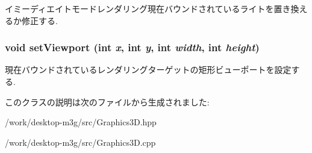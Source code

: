 イミーディエイトモードレンダリング現在バウンドされているライトを置き換えるか修正する. \hypertarget{classm3g_1_1Graphics3D_0b4ec48e9c19060e9be5648c118c23b1}{
\subsubsection[{setViewport}]{\setlength{\rightskip}{0pt plus 5cm}void setViewport (int {\em x}, \/  int {\em y}, \/  int {\em width}, \/  int {\em height})}}
\label{classm3g_1_1Graphics3D_0b4ec48e9c19060e9be5648c118c23b1}


現在バウンドされているレンダリングターゲットの矩形ビューポートを設定する. 

このクラスの説明は次のファイルから生成されました:\begin{CompactItemize}
\item 
/work/desktop-m3g/src/Graphics3D.hpp\item 
/work/desktop-m3g/src/Graphics3D.cpp\end{CompactItemize}
